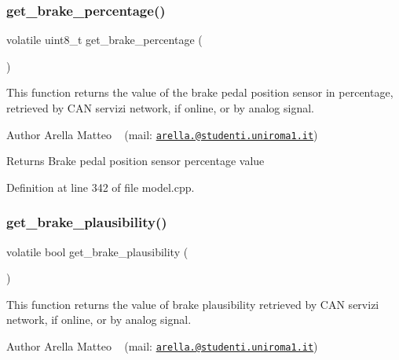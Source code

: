 \subsubsection{\texorpdfstring{get\+\_\+brake\+\_\+percentage()}{get\_brake\_percentage()}}
{\footnotesize\ttfamily volatile uint8\+\_\+t get\+\_\+brake\+\_\+percentage (\begin{DoxyParamCaption}{ }\end{DoxyParamCaption})}



This function returns the value of the brake pedal position sensor in percentage, retrieved by C\+AN servizi network, if online, or by analog signal. 

\begin{DoxyAuthor}{Author}
Arella Matteo ~\newline
 (mail\+: \href{mailto:arella.1646983@studenti.uniroma1.it}{\tt arella.@studenti.\+uniroma1.\+it})
\end{DoxyAuthor}
\begin{DoxyReturn}{Returns}
Brake pedal position sensor percentage value 
\end{DoxyReturn}


Definition at line 342 of file model.\+cpp.

\mbox{\label{group___board__model__group_gad47b702f79115e19d75b22f39b45efeb}} 
\subsubsection{\texorpdfstring{get\+\_\+brake\+\_\+plausibility()}{get\_brake\_plausibility()}}
{\footnotesize\ttfamily volatile bool get\+\_\+brake\+\_\+plausibility (\begin{DoxyParamCaption}{ }\end{DoxyParamCaption})}



This function returns the value of brake plausibility retrieved by C\+AN servizi network, if online, or by analog signal. 

\begin{DoxyAuthor}{Author}
Arella Matteo ~\newline
 (mail\+: \href{mailto:arella.1646983@studenti.uniroma1.it}{\tt arella.@studenti.\+uniroma1.\+it})
\end{DoxyAuthor}

